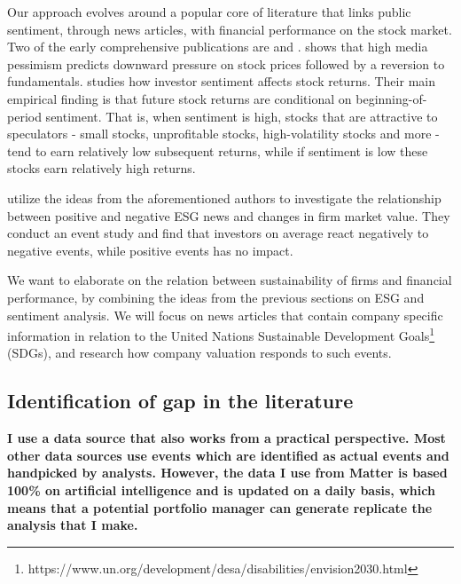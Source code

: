 Our approach evolves around a popular core of literature that links public sentiment, through news articles, with financial performance on the stock market. Two of the early comprehensive publications are \cite{tetlock_sentiment} and \cite{baker_sentiment}. \citeauthor{tetlock_sentiment} shows that high media pessimism predicts downward pressure on stock prices followed by a reversion to fundamentals. \citeauthor{baker_sentiment} studies how investor sentiment affects stock returns. Their main empirical finding is that future stock returns are conditional on beginning-of-period sentiment. That is, when sentiment is high, stocks that are attractive to speculators - small stocks, unprofitable stocks, high-volatility stocks and more - tend to earn relatively low subsequent returns, while if sentiment is low these stocks earn relatively high returns.   

\cite{Blancard_ESG_sentiment} utilize the ideas from the aforementioned authors to investigate the relationship between positive and negative ESG news and changes in firm market value. They conduct an event study and find that investors on average react negatively to negative events, while positive events has no impact. 

We want to elaborate on the relation between sustainability of firms and financial performance, by combining the ideas from the previous sections on ESG and sentiment analysis. We will focus on news articles that contain company specific information in relation to the United Nations Sustainable Development Goals\footnote{https://www.un.org/development/desa/disabilities/envision2030.html} (SDGs), and research how company valuation responds to such events. 



\subsection{Identification of gap in the literature}

\textbf{I use a data source that also works from a practical perspective. Most other data sources use events which are identified as actual events and handpicked by analysts. However, the data I use from Matter is based 100\% on artificial intelligence and is updated on a daily basis, which means that a potential portfolio manager can generate replicate the analysis that I make.   }